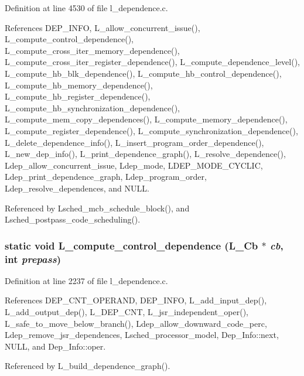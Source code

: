 Definition at line 4530 of file l\_\-dependence.c.

References DEP\_\-INFO, L\_\-allow\_\-concurrent\_\-issue(), L\_\-compute\_\-control\_\-dependence(), L\_\-compute\_\-cross\_\-iter\_\-memory\_\-dependence(), L\_\-compute\_\-cross\_\-iter\_\-register\_\-dependence(), L\_\-compute\_\-dependence\_\-level(), L\_\-compute\_\-hb\_\-blk\_\-dependence(), L\_\-compute\_\-hb\_\-control\_\-dependence(), L\_\-compute\_\-hb\_\-memory\_\-dependence(), L\_\-compute\_\-hb\_\-register\_\-dependence(), L\_\-compute\_\-hb\_\-synchronization\_\-dependence(), L\_\-compute\_\-mem\_\-copy\_\-dependences(), L\_\-compute\_\-memory\_\-dependence(), L\_\-compute\_\-register\_\-dependence(), L\_\-compute\_\-synchronization\_\-dependence(), L\_\-delete\_\-dependence\_\-info(), L\_\-insert\_\-program\_\-order\_\-dependence(), L\_\-new\_\-dep\_\-info(), L\_\-print\_\-dependence\_\-graph(), L\_\-resolve\_\-dependence(), Ldep\_\-allow\_\-concurrent\_\-issue, Ldep\_\-mode, LDEP\_\-MODE\_\-CYCLIC, Ldep\_\-print\_\-dependence\_\-graph, Ldep\_\-program\_\-order, Ldep\_\-resolve\_\-dependences, and NULL.

Referenced by Lsched\_\-mcb\_\-schedule\_\-block(), and Lsched\_\-postpass\_\-code\_\-scheduling().
\subsubsection{\setlength{\rightskip}{0pt plus 5cm}static void L\_\-compute\_\-control\_\-dependence (L\_\-Cb $\ast$ {\em cb}, int {\em prepass})\hspace{0.3cm}{\tt  [static]}}\label{l__dependence_8c_2f283aa12bb18774c6525fb5743b279c}




Definition at line 2237 of file l\_\-dependence.c.

References DEP\_\-CNT\_\-OPERAND, DEP\_\-INFO, L\_\-add\_\-input\_\-dep(), L\_\-add\_\-output\_\-dep(), L\_\-DEP\_\-CNT, L\_\-jsr\_\-independent\_\-oper(), L\_\-safe\_\-to\_\-move\_\-below\_\-branch(), Ldep\_\-allow\_\-downward\_\-code\_\-perc, Ldep\_\-remove\_\-jsr\_\-dependences, Lsched\_\-processor\_\-model, Dep\_\-Info::next, NULL, and Dep\_\-Info::oper.

Referenced by L\_\-build\_\-dependence\_\-graph().
